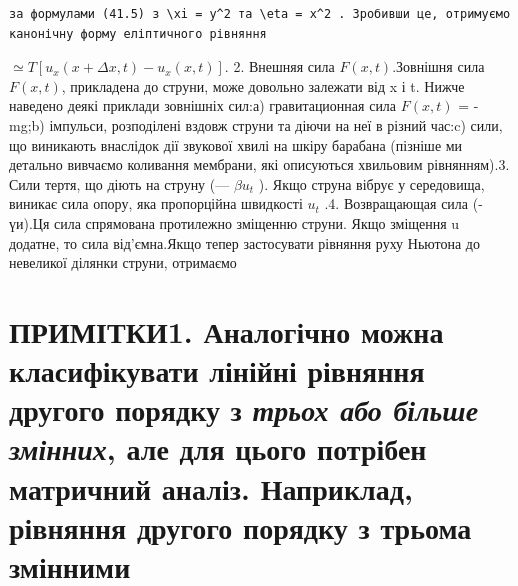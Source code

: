 \documentclass[
  ukrainian,
]{article}
\begin{document}
\begin{verbatim}
за формулами (41.5) з \xi = y^2 та \eta = x^2 . Зробивши це, отримуємо канонічну форму еліптичного рівняння
\end{verbatim}

\(\simeq T [u_x(x + \Delta x, t) - u_x(x, t)].\) 2. Внешняя сила
\(F (x, t)\).Зовнішня сила \(F(x, t)\), прикладена до струни, може
довольно залежати від x і t. Нижче наведено деякі приклади зовнішніх
сил:а) гравитационная сила \(F(x, t)\) = -mg;b) імпульси, розподілені
вздовж струни та діючи на неї в різний час:c) сили, що виникають
внаслідок дії звукової хвилі на шкіру барабана (пізніше ми детально
вивчаємо коливання мембрани, які описуються хвильовим рівнянням).3. Сили
тертя, що діють на струну (--- \(\beta u_t\) ). Якщо струна вібрує у
середовища, виникає сила опору, яка пропорційна швидкості \(u_t\) .4.
Возвращающая сила (- үи).Ця сила спрямована протилежно зміщенню струни.
Якщо зміщення u додатне, то сила від'ємна.Якщо тепер застосувати
рівняння руху Ньютона до невеликої ділянки струни, отримаємо

\section{\texorpdfstring{ПРИМІТКИ1. Аналогічно можна класифікувати
лінійні рівняння другого порядку з \emph{трьох або більше змінних}, але
для цього потрібен матричний аналіз. Наприклад, рівняння другого порядку
з трьома
змінними}{ПРИМІТКИ1. Аналогічно можна класифікувати лінійні рівняння другого порядку з трьох або більше змінних, але для цього потрібен матричний аналіз. Наприклад, рівняння другого порядку з трьома змінними}}\label{ux43fux440ux438ux43cux456ux442ux43aux4381.-ux430ux43dux430ux43bux43eux433ux456ux447ux43dux43e-ux43cux43eux436ux43dux430-ux43aux43bux430ux441ux438ux444ux456ux43aux443ux432ux430ux442ux438-ux43bux456ux43dux456ux439ux43dux456-ux440ux456ux432ux43dux44fux43dux43dux44f-ux434ux440ux443ux433ux43eux433ux43e-ux43fux43eux440ux44fux434ux43aux443-ux437-ux442ux440ux44cux43eux445-ux430ux431ux43e-ux431ux456ux43bux44cux448ux435-ux437ux43cux456ux43dux43dux438ux445-ux430ux43bux435-ux434ux43bux44f-ux446ux44cux43eux433ux43e-ux43fux43eux442ux440ux456ux431ux435ux43d-ux43cux430ux442ux440ux438ux447ux43dux438ux439-ux430ux43dux430ux43bux456ux437.-ux43dux430ux43fux440ux438ux43aux43bux430ux434-ux440ux456ux432ux43dux44fux43dux43dux44f-ux434ux440ux443ux433ux43eux433ux43e-ux43fux43eux440ux44fux434ux43aux443-ux437-ux442ux440ux44cux43eux43cux430-ux437ux43cux456ux43dux43dux438ux43cux438}
\end{document}
